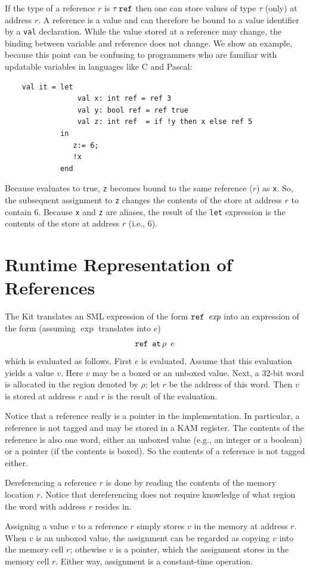 \documentclass[12pt]{book}
\begin{document}
\noindent
If the type of a reference $r$ is $\tau\,\hbox{\tt ref}$ then one can store
values of type $\tau$ (only) at address $r$.  A reference is a value
and can therefore be bound to a value identifier by a {\tt val}
declaration. While the value stored at a reference may change, the
binding between variable and reference does not change. We show an
example, because this point can be confusing to programmers who are
familiar with updatable variables in languages like C and Pascal:
\begin{verbatim}
    val it = let
                 val x: int ref = ref 3
                 val y: bool ref = ref true
                 val z: int ref  = if !y then x else ref 5
             in 
                z:= 6;
                !x
             end
\end{verbatim}
Because  evaluates to true, {\tt z} becomes bound
to the same reference ($r$) as {\tt x}. 
So, the subsequent assignment to {\tt z} 
changes the contents of the store at address $r$
to contain 6. Because {\tt x} and {\tt z} are aliases, the
result of the {\tt let} expression is the contents of the store
at address $r$ (i.e., 6).

\section{Runtime Representation of References}
The Kit translates an 
SML expression of the form $\hbox{\tt ref $\hbox{\it exp}$}$\/ into
an expression of the form (assuming $\exp$ translates into $e$)
$$\hbox{\tt ref $\mathbin{\hbox{\tt at}}\,\rho~ e$}$$
which is evaluated as follows. First
$e$ is evaluated. Assume that this evaluation yields a value $v$. Here
$v$ may be a boxed or an unboxed value.  Next, a 32-bit
word is allocated in the region denoted by $\rho$; let $r$ be the
address of this word. Then $v$ is stored at address $r$ and $r$ is the
result of the evaluation.

Notice that a reference really is a pointer in the implementation.  In
particular, a reference is not tagged and may be stored in a KAM
register. The contents of the reference is also one word, either an
unboxed value (e.g., an integer or a boolean) or a pointer (if the
contents is boxed).  So the contents of a reference is not tagged
either.

Dereferencing a reference $r$ is done by reading the contents of the
memory location $r$.  Notice that dereferencing does not require
knowledge of what region the word with address $r$ resides in.

Assigning a value $v$ to a reference $r$ simply stores $v$ in the
memory at address $r$. When $v$ is an unboxed value, the assignment can be
regarded as copying $v$ into the memory cell $r$; othewise $v$ is
a pointer, which the assignment stores in the memory cell $r$. Either
way, assignment is a constant-time operation.
\end{document}
